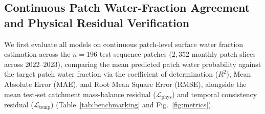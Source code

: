 \documentclass[journal]{IEEEtran}
\begin{document}
\subsection{Continuous Patch Water-Fraction Agreement and Physical Residual Verification}
We first evaluate all models on continuous patch-level surface water fraction estimation across the $n = 196$ test sequence patches ($2,352$ monthly patch slices across 2022--2023), comparing the mean predicted patch water probability against the target patch water fraction via the coefficient of determination ($R^2$), Mean Absolute Error (MAE), and Root Mean Square Error (RMSE), alongside the mean test-set catchment mass-balance residual ($\mathcal{L}_{\text{phys}}$) and temporal consistency residual ($\mathcal{L}_{\text{temp}}$) (Table~\ref{tab:benchmarking} and Fig.~\ref{fig:metrics}).

\begin{table}[!t]
\caption{Verified Continuous Patch Water-Fraction Agreement ($n=196$ Test Patches) and Physical/Temporal Residuals}
\label{tab:benchmarking}
\centering
{}
\end{table}
\end{document}
